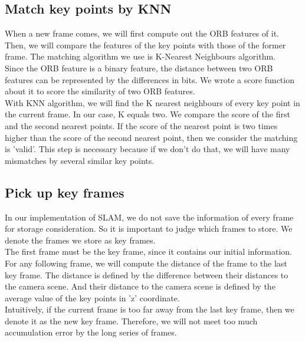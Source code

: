 \documentclass[paper=a4, fontsize=14pt]{scrartcl}
\numberwithin{equation}{section}		%
\numberwithin{figure}{section}			%
\numberwithin{table}{section}				%
\begin{document}
\subsection{Match key points by KNN}
When a new frame comes, we will first compute out the ORB features of it. Then, we will compare the features of the key points with those of the former frame. The matching algorithm we use is K-Nearest Neighbours algorithm\cite{altman1992introduction}.\\
\indent Since the ORB feature is a binary feature, the distance between two ORB features can be represented by the differences in bits. We wrote a score function about it to score the similarity of two ORB features.\\
\indent With KNN algorithm, we will find the K nearest neighbours of every key point in the current frame. 
In our case, K equals two. We compare the score of the first and the second nearest points. If the score of the nearest point is two times higher than the score of the second nearest point, then we consider the matching is 'valid'. This step is necessary because if we don't do that, we will have many mismatches by several similar key points.

\subsection{Pick up key frames}
In our implementation of SLAM, we do not save the information of every frame for storage consideration. So it is important to judge which frames to store. We denote the frames we store as key frames.\\
\indent The first frame must be the key frame, since it contains our initial information. For any following frame, we will compute the distance of the frame to the last key frame. The distance is defined by the difference between their distances to the camera scene. And their distance to the camera scene is defined by the average value of the key points in 'z' coordinate.\\
\indent Intuitively, if the current frame is too far away from the last key frame, then we denote it as the new key frame. Therefore, we will not meet too much accumulation error by the long series of frames.
\end{document}
